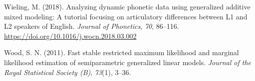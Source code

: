 \documentclass[
  man]{apa6}
\newlength{\cslhangindent}
\newlength{\cslentryspacingunit} %
\newenvironment{CSLReferences}[2] %
 {%
  \setlength{\parindent}{0pt}
  \ifodd #1
  \let\oldpar\par
  \def\par{\hangindent=\cslhangindent\oldpar}
  \fi
  \setlength{\parskip}{#2\cslentryspacingunit}
 }%
 {}
\begin{document}
\begin{CSLReferences}{1}{0}
\leavevmode{}%
Wieling, M. (2018). Analyzing dynamic phonetic data using generalized additive mixed modeling: {A} tutorial focusing on articulatory differences between {L1} and {L2} speakers of {English}. \emph{Journal of Phonetics}, \emph{70}, 86--116. \url{https://doi.org/10.1016/j.wocn.2018.03.002}

\leavevmode{}%
Wood, S. N. (2011). Fast stable restricted maximum likelihood and marginal likelihood estimation of semiparametric generalized linear models. \emph{Journal of the Royal Statistical Society (B)}, \emph{73}(1), 3--36.

\end{CSLReferences}


\clearpage
\renewcommand{\listfigurename}{Figure captions}
\end{document}

